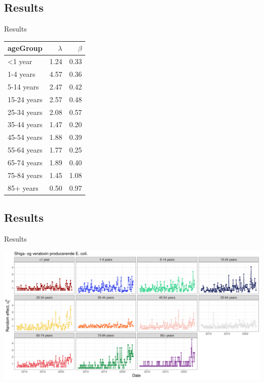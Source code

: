 \documentclass[aspectratio=169]{beamer}
\begin{document}
\hypertarget{results-2}{%
\subsection{Results}\label{results-2}}

\begin{frame}{Results}
\tiny

\begin{table}
\centering\begingroup\fontsize{10}{12}\selectfont

\begin{tabular}{lrr}
\toprule
ageGroup & $\lambda$ & $\beta$\\
\midrule
<1 year & 1.24 & 0.33\\
1-4 years & 4.57 & 0.36\\
5-14 years & 2.47 & 0.42\\
15-24 years & 2.57 & 0.48\\
25-34 years & 2.08 & 0.57\\
35-44 years & 1.47 & 0.20\\
45-54 years & 1.88 & 0.39\\
55-64 years & 1.77 & 0.25\\
65-74 years & 1.89 & 0.40\\
75-84 years & 1.45 & 1.08\\
85+ years & 0.50 & 0.97\\
\bottomrule
\end{tabular}
\endgroup{}
\end{table}

\normalsize
\end{frame}

\hypertarget{results-3}{%
\subsection{Results}\label{results-3}}

\begin{frame}{Results}
\tiny

\includegraphics[width=1\linewidth]{../figures/PoisGxSTEC}

\normalsize
\end{frame}
\end{document}
